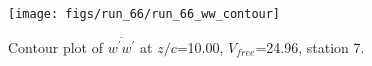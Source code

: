 \begin{figure}[H]
\centering
\texttt{[image: figs/run\_66/run\_66\_ww\_contour]}
\caption{Contour plot of $\overline{w^\prime w^\prime}$ at $z/c$=10.00, $V_{free}$=24.96, station 7.}
\label{fig:run_66_ww_contour}
\end{figure}


